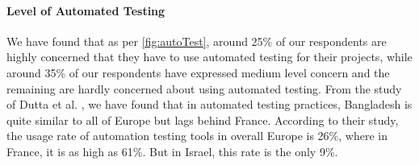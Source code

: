 \paragraph{Level of Automated Testing}
We have found that as per \ref{fig:autoTest}, around 25\% of our respondents are highly concerned that they have to use automated testing for their projects, while around 35\% of our respondents have expressed medium level concern and the remaining are hardly concerned about using automated testing. From the study of Dutta et al. \citep{dutta1999}, we have found that in automated testing practices, Bangladesh is quite similar to all of Europe but lags behind France. According to their study, the usage rate of automation testing tools in overall Europe is 26\%, where in France, it is as high as 61\%. But in Israel, this rate is the only 9\%.
